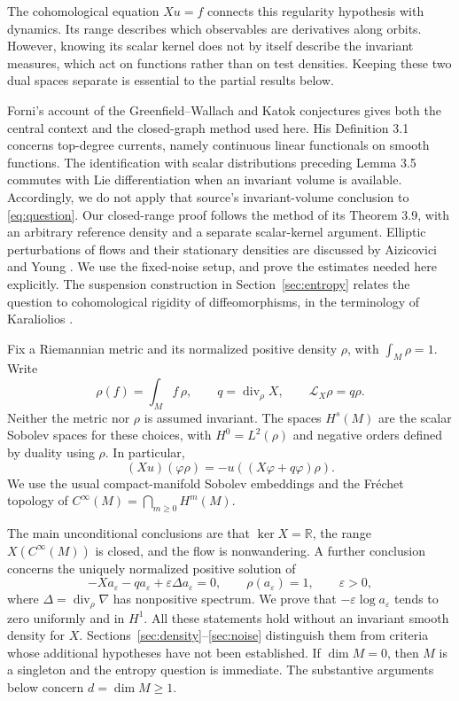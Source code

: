 \documentclass[11pt]{article}
\theoremstyle{definition}
\theoremstyle{remark}
\newcommand{\R}{\mathbb R}
\newcommand{\eps}{\varepsilon}
\DeclareMathOperator{\diver}{div}
\begin{document}
The cohomological equation $Xu=f$ connects this regularity hypothesis with dynamics. Its range describes which observables are derivatives along orbits. However, knowing its scalar kernel does not by itself describe the invariant measures, which act on functions rather than on test densities. Keeping these two dual spaces separate is essential to the partial results below.

Forni's account of the Greenfield--Wallach and Katok conjectures \cite{Forni} gives both the central context and the closed-graph method used here. His Definition 3.1 concerns top-degree currents, namely continuous linear functionals on smooth functions. The identification with scalar distributions preceding Lemma 3.5 commutes with Lie differentiation when an invariant volume is available. Accordingly, we do not apply that source's invariant-volume conclusion to \eqref{eq:question}. Our closed-range proof follows the method of its Theorem 3.9, with an arbitrary reference density and a separate scalar-kernel argument. Elliptic perturbations of flows and their stationary densities are discussed by Aizicovici and Young \cite{AY}. We use the fixed-noise setup, and prove the estimates needed here explicitly. The suspension construction in Section~\ref{sec:entropy} relates the question to cohomological rigidity of diffeomorphisms, in the terminology of Karaliolios \cite[\S1.1]{Kar}.

Fix a Riemannian metric and its normalized positive density $\rho$, with $\int_M\rho=1$. Write
\[
 \rho(f)=\int_M f\,\rho,\qquad
 q=\diver_\rho X,\qquad \mathcal L_X\rho=q\rho.
\]
Neither the metric nor $\rho$ is assumed invariant. The spaces $H^s(M)$ are the scalar Sobolev spaces for these choices, with $H^0=L^2(\rho)$ and negative orders defined by duality using $\rho$. In particular,
\begin{equation}\label{eq:scalar}
 (Xu)(\varphi\rho)=-u((X\varphi+q\varphi)\rho).
\end{equation}
We use the usual compact-manifold Sobolev embeddings and the Fr\'echet topology of $C^\infty(M)=\bigcap_{m\ge0}H^m(M)$.

The main unconditional conclusions are that $\ker X=\R$, the range $X(C^\infty(M))$ is closed, and the flow is nonwandering. A further conclusion concerns the uniquely normalized positive solution of
\begin{equation}\label{eq:stationary-intro}
 -Xa_\eps-qa_\eps+\eps\Delta a_\eps=0,
 \qquad \rho(a_\eps)=1,\qquad \eps>0,
\end{equation}
where $\Delta=\diver_\rho\nabla$ has nonpositive spectrum. We prove that $-\eps\log a_\eps$ tends to zero uniformly and in $H^1$. All these statements hold without an invariant smooth density for $X$. Sections~\ref{sec:density}--\ref{sec:noise} distinguish them from criteria whose additional hypotheses have not been established. If $\dim M=0$, then $M$ is a singleton and the entropy question is immediate. The substantive arguments below concern $d=\dim M\ge1$.
\end{document}
